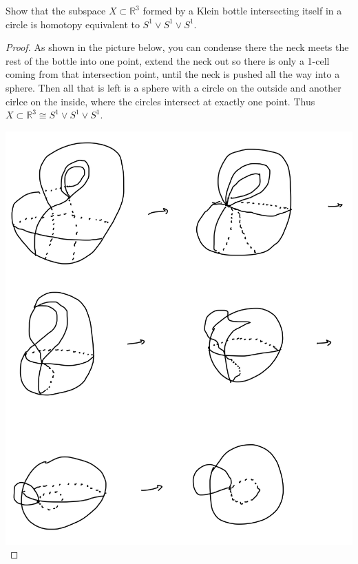 \documentclass[12pt]{article}
\newenvironment{statement}[2][Statement]{\begin{trivlist}
\item[\hskip \labelsep {\bfseries #1}\hskip \labelsep {\bfseries #2.}]}{\end{trivlist}}
\begin{document}
\begin{statement}[Exercise]{0.20}
    Show that the subspace $X \subset \mathbb{R}^3$ formed by a Klein bottle intersecting itself in a circle is homotopy equivalent to $S^1 \vee S^1 \vee S^1$.
\end{statement}
\begin{proof}
    As shown in the picture below, you can condense there the neck meets the rest of the bottle into one point, extend the neck out so there is only a 1-cell coming from that intersection point, until the neck is pushed all the way into a sphere. Then all that is left is a sphere with a circle on the outside and another cirlce on the inside, where the circles intersect at exactly one point. Thus $X \subset \mathbb{R}^3 \cong S^1 \vee S^1 \vee S^1$.
    \par \includegraphics[scale=.3]{0.20.jpg}
\end{proof}
\end{document}
